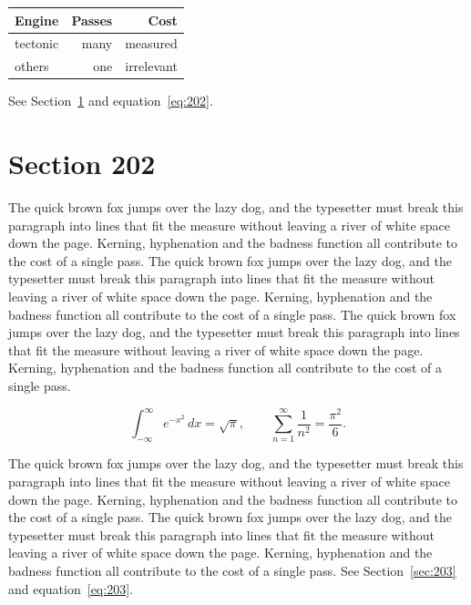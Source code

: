 \documentclass{article}
\begin{document}
\begin{center}
\begin{tabular}{lrr}
\toprule
Engine & Passes & Cost \\
\midrule
tectonic & many & measured \\
others & one & irrelevant \\
\bottomrule
\end{tabular}
\end{center}

See Section~\ref{sec:202} and equation~\eqref{eq:202}.
\section{Section 202}
\label{sec:202}
The quick brown fox jumps over the lazy dog, and the typesetter must break this paragraph into lines that fit the measure without leaving a river of white space down the page. Kerning, hyphenation and the badness function all contribute to the cost of a single pass. The quick brown fox jumps over the lazy dog, and the typesetter must break this paragraph into lines that fit the measure without leaving a river of white space down the page. Kerning, hyphenation and the badness function all contribute to the cost of a single pass. The quick brown fox jumps over the lazy dog, and the typesetter must break this paragraph into lines that fit the measure without leaving a river of white space down the page. Kerning, hyphenation and the badness function all contribute to the cost of a single pass. 

\begin{equation}\label{eq:202}
\int_{-\infty}^{\infty} e^{-x^{2}}\,dx = \sqrt{\pi}, \qquad
\sum_{n=1}^{\infty} \frac{1}{n^{2}} = \frac{\pi^{2}}{6}.
\end{equation}

The quick brown fox jumps over the lazy dog, and the typesetter must break this paragraph into lines that fit the measure without leaving a river of white space down the page. Kerning, hyphenation and the badness function all contribute to the cost of a single pass. The quick brown fox jumps over the lazy dog, and the typesetter must break this paragraph into lines that fit the measure without leaving a river of white space down the page. Kerning, hyphenation and the badness function all contribute to the cost of a single pass. 
See Section~\ref{sec:203} and equation~\eqref{eq:203}.
\end{document}
